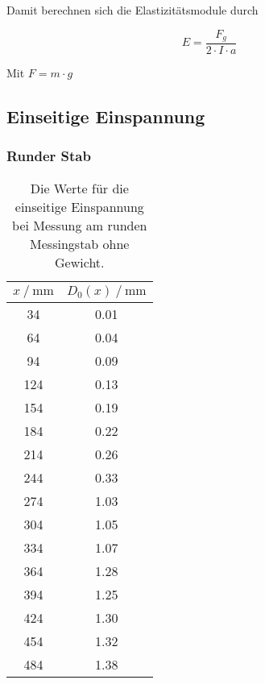Damit berechnen sich die Elastizitätsmodule durch 

\begin{equation}
   E = \frac{F_g}{2 \cdot I \cdot a}   
\end{equation}

Mit $F = m \cdot g$



\subsection{Einseitige Einspannung}
\label{sec:EinseitigeEinspannungAusw}

      \subsubsection{Runder Stab}
      \label{sec:Runder Stab}


\begin{table}[H]
  \centering
  \caption{Die Werte für die einseitige Einspannung bei Messung am runden Messingstab ohne Gewicht.}
  \begin{tabular}{cc}
    \toprule
    {$x \mathbin{/} \unit{\milli\metre}$} &
    {$D_0(x) \mathbin{/} \unit{\milli\metre}$} \\
    \midrule
     34 & 0.01 \\  
     64 & 0.04 \\
     94 & 0.09 \\
    124 & 0.13 \\  
    154 & 0.19 \\
    184 & 0.22 \\
    214 & 0.26 \\
    244 & 0.33 \\
    274 & 1.03 \\
    304 & 1.05 \\
    334 & 1.07 \\
    364 & 1.28 \\
    394 & 1.25 \\
    424 & 1.30 \\
    454 & 1.32 \\
    484 & 1.38 \\

    \bottomrule
  \end{tabular}
  \label{tab:Tabelle1}
\end{table}



